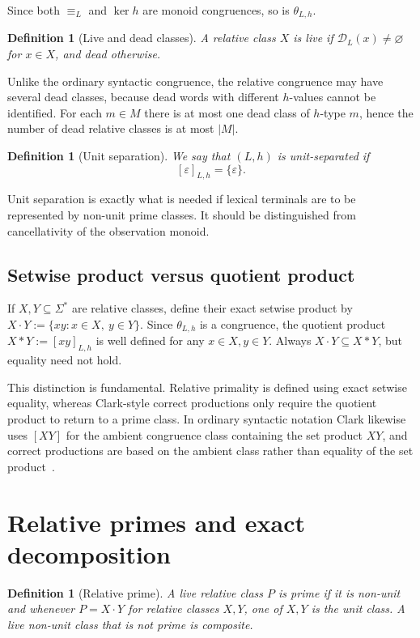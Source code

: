 \documentclass[11pt,a4paper]{article}
\newtheorem{definition}[theorem]{Definition}
\newcommand{\eps}{\varepsilon}
\newcommand{\D}{\mathcal D}
\begin{document}
Since both $\equiv_L$ and $\ker h$ are monoid congruences, so is $\theta_{L,h}$.

\begin{definition}[Live and dead classes]
A relative class $X$ is \emph{live} if $\D_L(x)\neq\varnothing$ for $x\in X$, and \emph{dead} otherwise.
\end{definition}

Unlike the ordinary syntactic congruence, the relative congruence may have several dead classes, because dead words with different $h$-values cannot be identified.  For each $m\in M$ there is at most one dead class of $h$-type $m$, hence the number of dead relative classes is at most $|M|$.

\begin{definition}[Unit separation]
We say that $(L,h)$ is \emph{unit-separated} if
\[
  [\eps]_{L,h}=\{\eps\}.
  \tag{US}
\]
\end{definition}

Unit separation is exactly what is needed if lexical terminals are to be represented by non-unit prime classes.  It should be distinguished from cancellativity of the observation monoid.

\subsection{Setwise product versus quotient product}

If $X,Y\subseteq\Sigma^*$ are relative classes, define their exact setwise product by
\(X\cdot Y:=\{xy:x\in X,\ y\in Y\}.\)
Since $\theta_{L,h}$ is a congruence, the quotient product
\(X*Y:=[xy]_{L,h}\)
is well defined for any $x\in X,y\in Y$.  Always $X\cdot Y\subseteq X*Y$, but equality need not hold.

This distinction is fundamental.  Relative primality is defined using exact setwise equality, whereas Clark-style correct productions only require the quotient product to return to a prime class.  In ordinary syntactic notation Clark likewise uses $[XY]$ for the ambient congruence class containing the set product $XY$, and correct productions are based on the ambient class rather than equality of the set product~\cite{Clark2013Trees}.

\section{Relative primes and exact decomposition}

\begin{definition}[Relative prime]
A live relative class $P$ is \emph{prime} if it is non-unit and whenever
\(P=X\cdot Y\)
for relative classes $X,Y$, one of $X,Y$ is the unit class.  A live non-unit class that is not prime is \emph{composite}.
\end{definition}
\end{document}
